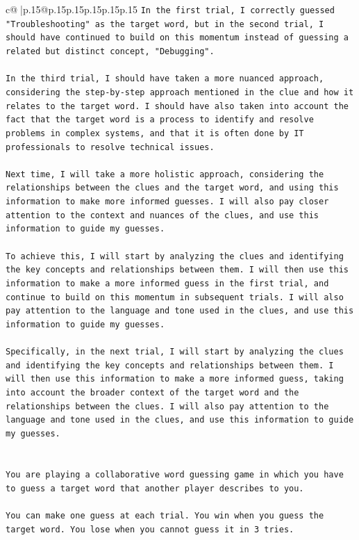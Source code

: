 \documentclass{article}
\begin{document}
{\begin{supertabular}{c@{$\;$}|p{.15\linewidth}@{}p{.15\linewidth}p{.15\linewidth}p{.15\linewidth}p{.15\linewidth}p{.15\linewidth}}
{{{\texttt{In the first trial, I correctly guessed "Troubleshooting" as the target word, but in the second trial, I should have continued to build on this momentum instead of guessing a related but distinct concept, "Debugging". } \\
\\ 
\texttt{In the third trial, I should have taken a more nuanced approach, considering the step{-}by{-}step approach mentioned in the clue and how it relates to the target word. I should have also taken into account the fact that the target word is a process to identify and resolve problems in complex systems, and that it is often done by IT professionals to resolve technical issues.} \\
\\ 
\texttt{Next time, I will take a more holistic approach, considering the relationships between the clues and the target word, and using this information to make more informed guesses. I will also pay closer attention to the context and nuances of the clues, and use this information to guide my guesses.} \\
\\ 
\texttt{To achieve this, I will start by analyzing the clues and identifying the key concepts and relationships between them. I will then use this information to make a more informed guess in the first trial, and continue to build on this momentum in subsequent trials. I will also pay attention to the language and tone used in the clues, and use this information to guide my guesses.} \\
\\ 
\texttt{Specifically, in the next trial, I will start by analyzing the clues and identifying the key concepts and relationships between them. I will then use this information to make a more informed guess, taking into account the broader context of the target word and the relationships between the clues. I will also pay attention to the language and tone used in the clues, and use this information to guide my guesses.} \\
\\ 
\\ 
\texttt{You are playing a collaborative word guessing game in which you have to guess a target word that another player describes to you.} \\
\\ 
\texttt{You can make one guess at each trial. You win when you guess the target word. You lose when you cannot guess it in 3 tries.} \\
}}}
\end{supertabular}}
\end{document}
